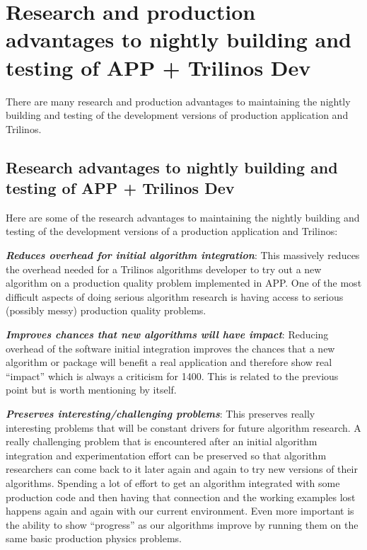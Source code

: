 \documentclass[pdf,ps2pdf,11pt]{SANDreport}
\begin{document}
%
{}\section{Research and production advantages to nightly building and testing
of APP + Trilinos Dev}
%

There are many research and production advantages to maintaining the nightly
building and testing of the development versions of production application and
Trilinos.


%
{}\subsection{Research advantages to nightly building and testing of APP +
Trilinos Dev}
%

Here are some of the research advantages to maintaining the nightly building
and testing of the development versions of a production application and
Trilinos:

{}\textit{\textbf{Reduces overhead for initial algorithm integration}}: This
massively reduces the overhead needed for a Trilinos algorithms developer to
try out a new algorithm on a production quality problem implemented in APP.
One of the most difficult aspects of doing serious algorithm research is
having access to serious (possibly messy) production quality problems.

{}\textit{\textbf{Improves chances that new algorithms will have impact}}:
Reducing overhead of the software initial integration improves the chances
that a new algorithm or package will benefit a real application and therefore
show real ``impact'' which is always a criticism for 1400.  This is related to
the previous point but is worth mentioning by itself.

{}\textit{\textbf{Preserves interesting/challenging problems}}: This preserves
really interesting problems that will be constant drivers for future algorithm
research.  A really challenging problem that is encountered after an initial
algorithm integration and experimentation effort can be preserved so that
algorithm researchers can come back to it later again and again to try new
versions of their algorithms.  Spending a lot of effort to get an algorithm
integrated with some production code and then having that connection and the
working examples lost happens again and again with our current environment.
Even more important is the ability to show ``progress'' as our algorithms
improve by running them on the same basic production physics problems.
\end{document}
